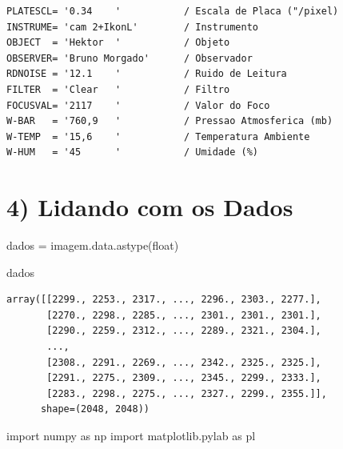 \documentclass[
  letterpaper,
  DIV=11,
  numbers=noendperiod]{scrreprt}
\newenvironment{Shaded}{\begin{snugshade}}{\end{snugshade}}
\newcommand{\BuiltInTok}[1]{\textcolor[rgb]{0.00,0.23,0.31}{#1}}
\newcommand{\ImportTok}[1]{\textcolor[rgb]{0.00,0.46,0.62}{#1}}
\newcommand{\NormalTok}[1]{\textcolor[rgb]{0.00,0.23,0.31}{#1}}
\newcommand{\OperatorTok}[1]{\textcolor[rgb]{0.37,0.37,0.37}{#1}}
\begin{document}
\begin{verbatim}
PLATESCL= '0.34    '           / Escala de Placa ("/pixel)                      
INSTRUME= 'cam 2+IkonL'        / Instrumento                                    
OBJECT  = 'Hektor  '           / Objeto                                         
OBSERVER= 'Bruno Morgado'      / Observador                                     
RDNOISE = '12.1    '           / Ruido de Leitura                               
FILTER  = 'Clear   '           / Filtro                                         
FOCUSVAL= '2117    '           / Valor do Foco                                  
W-BAR   = '760,9   '           / Pressao Atmosferica (mb)                       
W-TEMP  = '15,6    '           / Temperatura Ambiente                           
W-HUM   = '45      '           / Umidade (%)                                    
\end{verbatim}

\section{4) Lidando com os Dados}\label{lidando-com-os-dados}

\begin{Shaded}
\begin{Highlighting}[]
\NormalTok{dados }\OperatorTok{=}\NormalTok{ imagem.data.astype(}\BuiltInTok{float}\NormalTok{)}
\end{Highlighting}
\end{Shaded}

\begin{Shaded}
\begin{Highlighting}[]
\NormalTok{dados}
\end{Highlighting}
\end{Shaded}

\begin{verbatim}
array([[2299., 2253., 2317., ..., 2296., 2303., 2277.],
       [2270., 2298., 2285., ..., 2301., 2301., 2301.],
       [2290., 2259., 2312., ..., 2289., 2321., 2304.],
       ...,
       [2308., 2291., 2269., ..., 2342., 2325., 2325.],
       [2291., 2275., 2309., ..., 2345., 2299., 2333.],
       [2283., 2298., 2275., ..., 2327., 2299., 2355.]],
      shape=(2048, 2048))
\end{verbatim}

\begin{Shaded}
\begin{Highlighting}[]
\ImportTok{import}\NormalTok{ numpy }\ImportTok{as}\NormalTok{ np}
\ImportTok{import}\NormalTok{ matplotlib.pylab }\ImportTok{as}\NormalTok{ pl}
\end{Highlighting}
\end{Shaded}
\end{document}
